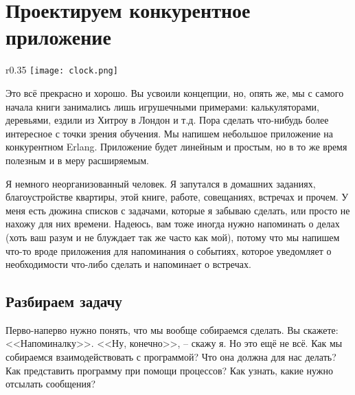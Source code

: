 \chapter{Проектируем конкурентное приложение}
\begin{wrapfigure}{r}{0.35\linewidth}
    \texttt{[image: clock.png]}
\end{wrapfigure}
Это всё прекрасно и хорошо.
Вы усвоили концепции, но, опять же, мы с самого начала книги занимались лишь игрушечными примерами: калькуляторами, деревьями, ездили из Хитроу в Лондон и т.д.
Пора сделать что\--нибудь более интересное с точки зрения обучения.
Мы напишем небольшое приложение на конкурентном Erlang.
Приложение будет линейным и простым, но в то же время полезным и в меру расширяемым.

Я немного неорганизованный человек.
Я запутался в домашних заданиях, благоустройстве квартиры, этой книге, работе, совещаниях, встречах и прочем.
У меня есть дюжина списков с задачами, которые я забываю сделать, или просто не нахожу для них времени.
Надеюсь, вам тоже иногда нужно напоминать о делах (хоть ваш разум  и не блуждает так же часто как мой), потому что мы напишем что\--то вроде приложения для напоминания о событиях, которое уведомляет о необходимости что\--либо сделать и напоминает о встречах.
\section{Разбираем задачу}
Перво\--наперво нужно понять, что мы вообще собираемся сделать.
Вы скажете: <<Напоминалку>>.
<<Ну, конечно>>, \--- скажу я.
Но это ещё не всё.
Как мы собираемся взаимодействовать с программой?
Что она должна для нас делать?
Как представить программу при помощи процессов?
Как узнать, какие нужно отсылать сообщения?


